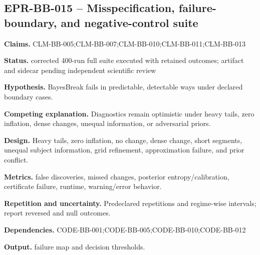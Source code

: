 \subsection{EPR-BB-015 -- Misspecification, failure-boundary, and negative-control suite}
\textbf{Claims.} CLM-BB-005;CLM-BB-007;CLM-BB-010;CLM-BB-011;CLM-BB-013\par
\textbf{Status.} corrected 400-run full suite executed with retained outcomes; artifact and sidecar pending independent scientific review\par
\textbf{Hypothesis.} BayesBreak fails in predictable, detectable ways under declared boundary cases.\par
\textbf{Competing explanation.} Diagnostics remain optimistic under heavy tails, zero inflation, dense changes, unequal information, or adversarial priors.\par
\textbf{Design.} Heavy tails, zero inflation, no change, dense change, short segments, unequal subject information, grid refinement, approximation failure, and prior conflict.\par
\textbf{Metrics.} false discoveries, missed changes, posterior entropy/calibration, certificate failure, runtime, warning/error behavior.\par
\textbf{Repetition and uncertainty.} Predeclared repetitions and regime-wise intervals; report reversed and null outcomes.\par
\textbf{Dependencies.} CODE-BB-001;CODE-BB-005;CODE-BB-010;CODE-BB-012\par
\textbf{Output.} failure map and decision thresholds.


